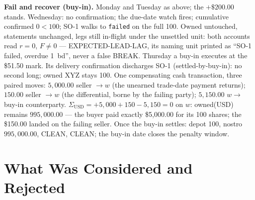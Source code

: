 \documentclass[11pt]{article}
\begin{document}
\textbf{Fail and recover (buy-in).} Monday and Tuesday as above; the $+\$200.00$
stands. Wednesday: no confirmation; the due-date watch fires; cumulative confirmed
$0 < 100$; SO-1 walks to \texttt{failed} on the full 100. Owned untouched,
statements unchanged, legs still in-flight under the unsettled unit: both accounts
read $r = 0$, $F \neq 0$ --- EXPECTED-LEAD-LAG, its naming unit printed as ``SO-1
failed, overdue 1~bd'', never a false BREAK. Thursday a buy-in executes at the
\$51.50 mark. Its delivery confirmation discharges SO-1 (settled-by-buy-in): no
second long; owned XYZ stays 100. One compensating cash transaction, three paired
moves: $5{,}000.00$ seller $\to w$ (the unearned trade-date payment returns);
$150.00$ seller $\to w$ (the differential, borne by the failing party);
$5{,}150.00$ $w \to$ buy-in counterparty. $\Sigma_{\mathrm{USD}} = +5{,}000 + 150
- 5{,}150 = 0$ on $w$: owned(USD) remains $995{,}000.00$ --- the buyer paid
exactly \$5{,}000.00 for its 100 shares; the \$150.00 landed on the failing
seller. Once the buy-in settles: depot 100, nostro $995{,}000.00$, CLEAN, CLEAN;
the buy-in date closes the penalty window.

\section{What Was Considered and Rejected}
\end{document}

